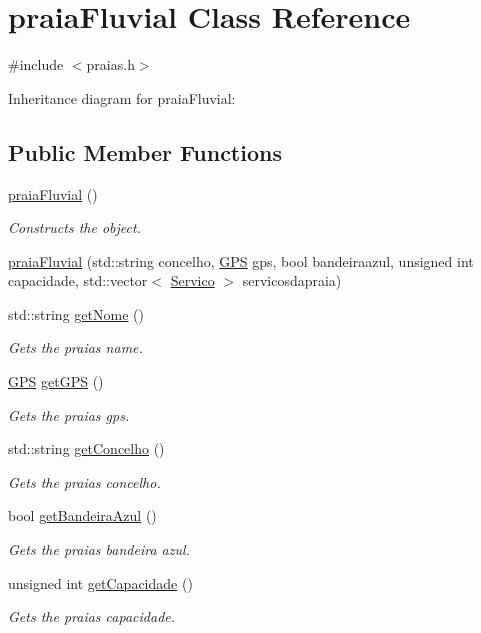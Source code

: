 \hypertarget{classpraiaFluvial}{}\section{praia\+Fluvial Class Reference}
\label{classpraiaFluvial}


{\ttfamily \#include $<$praias.\+h$>$}



Inheritance diagram for praia\+Fluvial\+:
\subsection*{Public Member Functions}
\begin{DoxyCompactItemize}
\item 
\hyperlink{classpraiaFluvial_ab88371de4e3b999d9150d1ee5d7f7673}{praia\+Fluvial} ()
\begin{DoxyCompactList}\small\item\em Constructs the object. \end{DoxyCompactList}\item 
\hyperlink{classpraiaFluvial_a75582da73fa39908bb5232f06fcede91}{praia\+Fluvial} (std\+::string concelho, \hyperlink{classGPS}{G\+PS} gps, bool bandeiraazul, unsigned int capacidade, std\+::vector$<$ \hyperlink{classServico}{Servico} $>$ servicosdapraia)
\item 
std\+::string \hyperlink{classpraiaFluvial_a79762e3121b2339a952c92e82890824f}{get\+Nome} ()
\begin{DoxyCompactList}\small\item\em Gets the praia\textquotesingle{}s name. \end{DoxyCompactList}\item 
\hyperlink{classGPS}{G\+PS} \hyperlink{classpraiaFluvial_ab1fc0621e1e2d7f1a11ef05ccc2c3af0}{get\+G\+PS} ()
\begin{DoxyCompactList}\small\item\em Gets the praia\textquotesingle{}s gps. \end{DoxyCompactList}\item 
std\+::string \hyperlink{classpraiaFluvial_aac6c4fd01595f9455f43b8bddb069d9d}{get\+Concelho} ()
\begin{DoxyCompactList}\small\item\em Gets the praia\textquotesingle{}s concelho. \end{DoxyCompactList}\item 
bool \hyperlink{classpraiaFluvial_a2bf7f90c2399cde302c55abbfba5987a}{get\+Bandeira\+Azul} ()
\begin{DoxyCompactList}\small\item\em Gets the praia\textquotesingle{}s bandeira azul. \end{DoxyCompactList}\item 
unsigned int \hyperlink{classpraiaFluvial_a36d0f4e21f5dde2250193c57ce43d907}{get\+Capacidade} ()
\begin{DoxyCompactList}\small\item\em Gets the praia\textquotesingle{}s capacidade. \end{DoxyCompactList}\end{DoxyCompactItemize}


